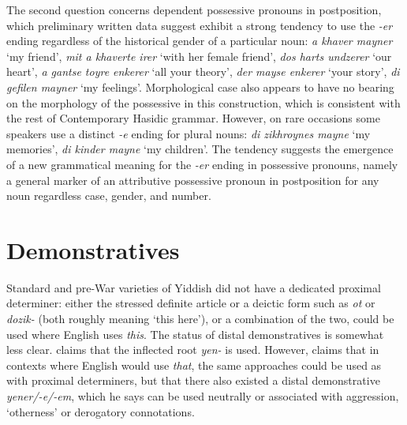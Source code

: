 \documentclass[output=paper, hidelinks]{langscibook}
\begin{document}

The second question concerns dependent possessive pronouns in postposition, which preliminary written data suggest exhibit a strong tendency to use the \textit{-er} ending regardless of the historical gender of a particular noun: \textit{a khaver mayner} `my friend', \textit{mit a khaverte irer} `with her female friend', \textit{dos harts undzerer} `our heart', \textit{a gantse toyre enkerer} `all your theory', \textit{der mayse enkerer} `your story', \textit{di gefilen mayner} `my feelings'. Morphological case also appears to have no bearing on the morphology of the possessive in this construction, which is consistent with the rest of Contemporary Hasidic grammar. However, on rare occasions some speakers use a distinct \textit{-e} ending for plural nouns: \textit{di zikhroynes mayne} `my memories', \textit{di kinder mayne} `my children'. The tendency suggests the emergence of a new grammatical meaning for the \textit{-er} ending in possessive pronouns, namely a general marker of an attributive possessive pronoun in postposition for any noun regardless case, gender, and number.



\section{Demonstratives}\label{sec:demonstratives}

Standard and pre-War varieties of Yiddish did not have a dedicated proximal determiner: either the stressed definite article or a deictic form such as \textit{ot} or \textit{dozik-} (both roughly meaning `this here'), or a combination of the two, could be used where English uses \textit{this}. The status of distal demonstratives is somewhat less clear. \citet[186]{Jacobs05} claims that the inflected root \textit{yen-} is used. However, \citet{Katz87} claims that in contexts where English would use \textit{that}, the same approaches could be used as with proximal determiners, but that there also existed a distal demonstrative \textit{yener/-e/-em}, which he says can be used neutrally or associated with aggression, `otherness' or derogatory connotations.
\end{document}
